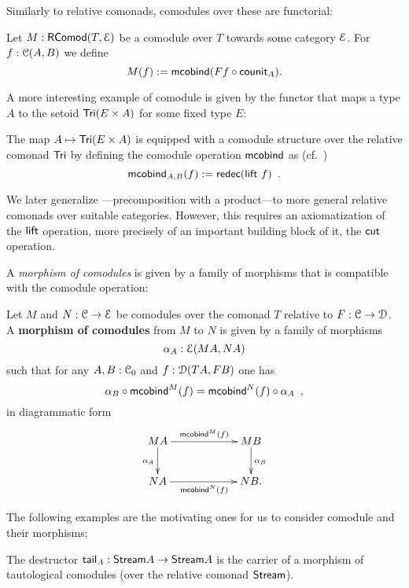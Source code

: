 \documentclass[a4paper,USenglish]{lipics}
\newcommand{\fat}[1]{\textbf{#1}}
\begin{document}
\begin{Long}
Similarly to relative comonads, comodules over these are functorial:
\begin{defn}
\label{def:comodule_lift}
 Let $M : \RComod(T,\E)$ be a comodule over $T$ towards some category $\E$. For $f : \C(A,B)$ we define
  \[ M(f) := \mcobind(\comp{\counit_A}{Ff}) .  \]
\end{defn}
\end{Long}

A more interesting example of comodule is given by the functor that maps a type $A$ to the setoid $\Tri(E\times A)$
for some fixed type $E$:
\begin{ex}\label{ex_tri_prod_comod}
   The map $A \mapsto \Tri(E\times A)$ is equipped with a comodule structure over the relative comonad $\Tri$ by
   defining the comodule operation $\mcobind$ as (cf.\ )
     \[ \mcobind_{A,B} (f) := \redec (\extend~f) \enspace . \]
\end{ex}

We later generalize ---precomposition with a product---to more general relative comonads over suitable categories.
However, this requires an axiomatization of the $\extend$ operation, more precisely of an important building block of it, the
$\cut$ operation.

A \emph{morphism of comodules} is given by a family of morphisms that is compatible with 
the comodule operation:

\begin{defn}
\label{def:morphism_of_comodules}
 Let $M$ and $N : \C \to \E$ be comodules over the comonad $T$ relative to  $F:\C \to \D$.
 A \fat{morphism of comodules} from $M$ to $N$ is given by a family of morphisms 
   \[ \alpha_A:\E(MA,NA) \]
 such that for any $A,B:\C_0$ and $f : \D(TA,FB)$ one has
 \[\comp{\mcobind^M(f)}{\alpha_B} = \comp{\alpha_A}{\mcobind^N(f)} \enspace, \]
 in diagrammatic form
 \[
  \begin{xy}
   \xymatrix@C=6em{
     MA  \ar[r]^{\mcobind^M(f)}  \ar[d]_{\alpha_A} & MB \ar[d]^{\alpha_B} \\
     NA  \ar[r]_{\mcobind^N(f)}  & NB.
   }
  \end{xy}
 \]

\end{defn}

The following examples are the motivating ones for us to consider comodule and their morphisms:

 \begin{ex}\label{ex_tail_comodule}
  The destructor $\stail_A : \stream A \to \stream A$ is the carrier of a morphism of tautological comodules (over the relative comonad $\stream$).
 \end{ex}
\end{document}
